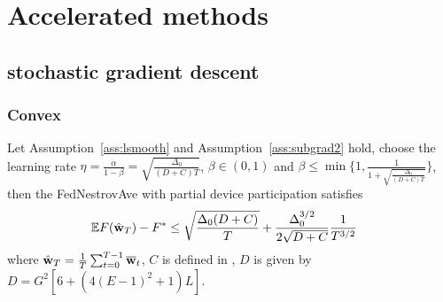 \section{Accelerated methods}
\subsection{stochastic gradient descent}
\subsubsection{Convex}
\begin{theorem}
	Let Assumption~\ref{ass:lsmooth} and Assumption~\ref{ass:subgrad2} hold,  choose the learning rate $\eta = \frac{\alpha}{1 - \beta} = \sqrt{\frac{\Delta_0}{(D+C)T}}$, $\beta \in (0, 1)$ and $\beta \leq \min\{1, \frac{1}{1 + \sqrt{\frac{\Delta_0}{(D+C)T}}}\}$, then the FedNestrovAve with partial device participation satisfies
	\begin{align}
		 \mathbb{E} F(\hat{{\mathbf{w}}}_T) - F^* &\leq \sqrt{\frac{\Delta_0(D + C)}{T}} + \frac{\Delta_0^{3/2}}{2\sqrt{D+C}}\frac{1}{T^{3/2}} 
	\end{align}
	where $\hat{{\mathbf{w}}}_T = \frac{1}{T}\sum_{t=0}^{T-1} {\overline{\mathbf{w}}}_t$, $C$ is defined in \eq{\ref{eq:partialsample}},
$D$ is given by $D =  G^2[6 + (4(E-1)^2+1)L]$.
\end{theorem}

